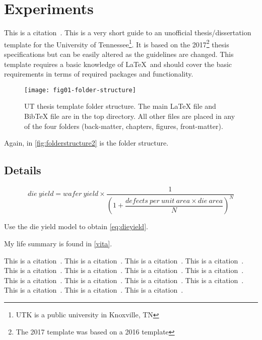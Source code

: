 \chapter{Experiments} \label{chapter2}

This is a citation~\cite{utk:idr2016optimization}.
This is a very short guide to an unofficial thesis/dissertation template
for the University of Tennessee\footnote{UTK is a public university in Knoxville,
TN}.
It is based on the 2017\footnote{The 2017 template was based on a 2016 template} thesis specifications but can be easily altered
as the guidelines are changed.
This template requires a basic knowledge of \LaTeX\ and should cover
the basic requirements in terms of required packages and functionality.

\begin{figure}[!htb]
    \Centering
    \texttt{[image: fig01-folder-structure]}
    \caption[UT thesis template folder structure]{UT thesis template folder structure.
        The main LaTeX file and BibTeX file are in the top directory.
        All other files are placed in any of the four folders
        (back-matter, chapters, figures, front-matter).}
    \label{fig:folderstructure2}
\end{figure}

Again, in \autoref{fig:folderstructure2} is the folder structure.

\section{Details} \label{details}

\begin{equation}
    die\ yield = wafer\ yield \times \dfrac{1}{\left(1 + \dfrac{defects\ per\ unit\ area \times die\ area}{N}\right)^N}
    \label{eq:dieyield}
\end{equation}

Use the die yield model to obtain \autoref{eq:dieyield}.

My life summary is found in \autoref{vita}.

This is a citation~\cite{utk:rdf2018jac}.
This is a citation~\cite{utk:hspwrap2015blast}.
This is a citation~\cite{pupr:plasma2014fpga}.
This is a citation~\cite{ornl:sensorfusion2012}.
This is a citation~\cite{ornl:dmrg2011}.
This is a citation~\cite{caaqa2017appsol}.
This is a citation~\cite{caaqa2017}.
This is a citation~\cite{ornl:poplar2014gateway}.
This is a citation~\cite{utk:hspwrap2014blast}.
This is a citation~\cite{ornl:async2012gpu}.
This is a citation~\cite{ornl:async2011gpu}.
This is a citation~\cite{ornl:dmrg2010}.
This is a citation~\cite{ornl:ipcc2009}.
This is a citation~\cite{utk:idr2015cohpc}.
This is a citation~\cite{pupr:chair2010icste}.

